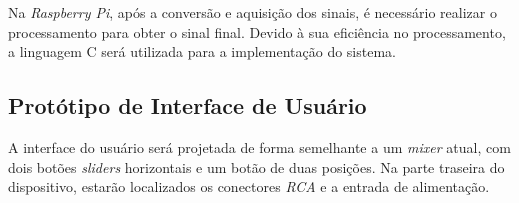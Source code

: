 Na \textit{Raspberry Pi}, após a conversão e aquisição dos sinais, é necessário realizar o processamento para obter o sinal final. Devido à sua eficiência no processamento, a linguagem C será utilizada para a implementação do sistema.

\subsection{Protótipo de Interface de Usuário}

A interface do usuário será projetada de forma semelhante a um \textit{mixer} atual, com dois botões \textit{sliders} horizontais e um botão de duas posições. Na parte traseira do dispositivo, estarão localizados os conectores \textit{RCA} e a entrada de alimentação.

